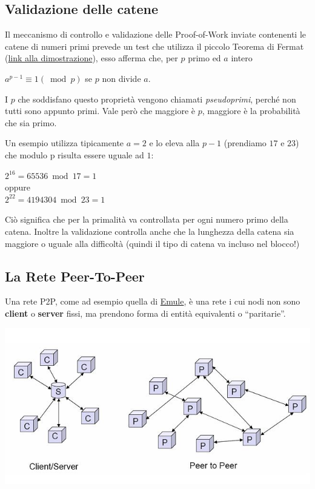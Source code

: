 \subsection*{Validazione delle catene}
Il meccanismo di controllo e validazione delle Proof-of-Work inviate contenenti le catene di numeri primi prevede un test che utilizza il piccolo Teorema di Fermat (\href{http://primes.utm.edu/notes/proofs/FermatsLittleTheorem.html}{link alla dimostrazione}), esso afferma che, per $p$ primo ed $a$ intero 
\begin{center}
$a^{p-1} \equiv 1 (\bmod p)$ se $p$ non divide $a$.
\end{center}

\noindent I $p$ che soddisfano questo proprietà vengono chiamati \textit{pseudoprimi}, perché non tutti sono appunto primi. Vale però che maggiore è $p$, maggiore è la probabilità che sia primo. 

\noindent Un esempio utilizza tipicamente $a=2$ e lo eleva alla $p-1$ (prendiamo $17$ e $23$) che modulo p risulta essere uguale ad $1$:
\begin{center}
$2^{16}= 65536 \bmod 17 = 1$ \\
oppure \\
$2^{22}= 4194304 \bmod 23 = 1$
\end{center}

Ciò significa che per la primalità va controllata per ogni numero primo della catena. Inoltre la validazione controlla anche che la lunghezza della catena sia maggiore o uguale alla difficoltà (quindi il tipo di catena va incluso nel blocco!)

\subsection{La Rete Peer-To-Peer}
Una rete P2P, come ad esempio quella di \href{www.emule-project.net/home/perl/}{Emule}, è una rete i cui nodi non sono \textbf{client} o \textbf{server} fissi, ma prendono forma di entità equivalenti o ``paritarie''.
\begin{center}
    \includegraphics[width=\linewidth]{img/p2p}
\end{center}

